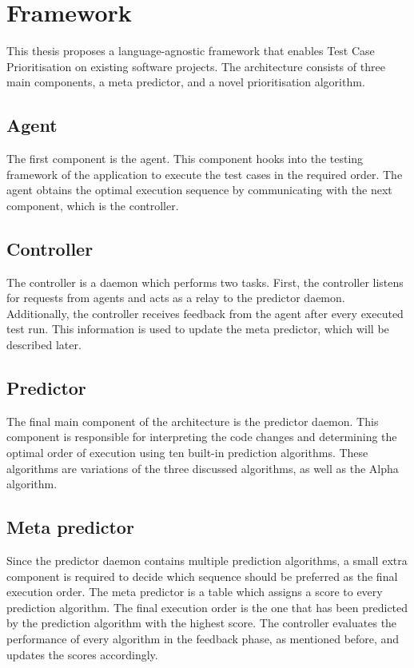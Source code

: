 \section{Framework}
\noindent This thesis proposes a language-agnostic framework that enables Test Case Prioritisation on existing software projects. The architecture consists of three main components, a meta predictor, and a novel prioritisation algorithm.

\subsection{Agent}
\noindent The first component is the agent. This component hooks into the testing framework of the application to execute the test cases in the required order. The agent obtains the optimal execution sequence by communicating with the next component, which is the controller.

\subsection{Controller}
\noindent The controller is a daemon which performs two tasks. First, the controller listens for requests from agents and acts as a relay to the predictor daemon. Additionally, the controller receives feedback from the agent after every executed test run. This information is used to update the meta predictor, which will be described later.

\subsection{Predictor}
\noindent The final main component of the architecture is the predictor daemon. This component is responsible for interpreting the code changes and determining the optimal order of execution using ten built-in prediction algorithms. These algorithms are variations of the three discussed algorithms, as well as the Alpha algorithm.

\subsection{Meta predictor}
\noindent Since the predictor daemon contains multiple prediction algorithms, a small extra component is required to decide which sequence should be preferred as the final execution order. The meta predictor is a table which assigns a score to every prediction algorithm. The final execution order is the one that has been predicted by the prediction algorithm with the highest score. The controller evaluates the performance of every algorithm in the feedback phase, as mentioned before, and updates the scores accordingly.

